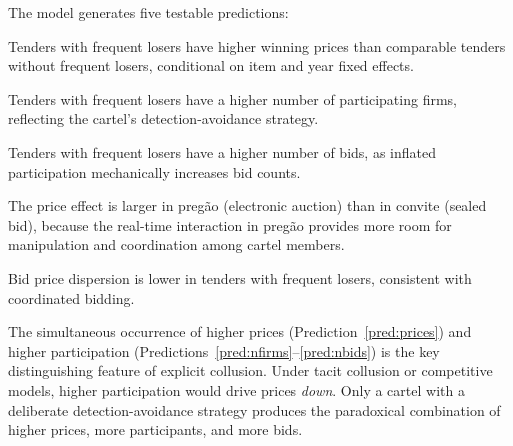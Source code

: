 The model generates five testable predictions:

\begin{prediction}[Prices]
\label{pred:prices}
Tenders with frequent losers have higher winning prices than comparable tenders without frequent losers, conditional on item and year fixed effects.
\end{prediction}

\begin{prediction}
\label{pred:nfirms}
Tenders with frequent losers have a higher number of participating firms, reflecting the cartel's detection-avoidance strategy.
\end{prediction}

\begin{prediction}
\label{pred:nbids}
Tenders with frequent losers have a higher number of bids, as inflated participation mechanically increases bid counts.
\end{prediction}

\begin{prediction}
\label{pred:mode}
The price effect is larger in preg\~{a}o (electronic auction) than in convite (sealed bid), because the real-time interaction in preg\~{a}o provides more room for manipulation and coordination among cartel members.
\end{prediction}

\begin{prediction}
\label{pred:dispersion}
Bid price dispersion is lower in tenders with frequent losers, consistent with coordinated bidding.
\end{prediction}

The simultaneous occurrence of higher prices (Prediction~\ref{pred:prices}) and higher participation (Predictions~\ref{pred:nfirms}--\ref{pred:nbids}) is the key distinguishing feature of explicit collusion. Under tacit collusion or competitive models, higher participation would drive prices \emph{down}. Only a cartel with a deliberate detection-avoidance strategy produces the paradoxical combination of higher prices, more participants, and more bids.
